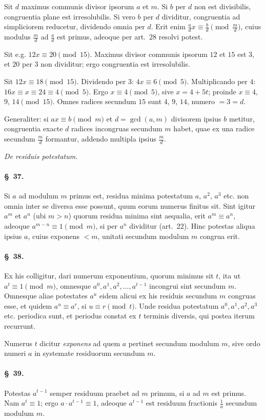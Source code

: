 \documentclass[12pt,a4paper]{article}
\theoremstyle{plain}
\theoremstyle{definition}
\theoremstyle{remark}
\newcommand{\art}[1]{\paragraph{\S\ #1.}}
\begin{document}
Sit $d$ maximus communis divisor ipsorum $a$ et $m$. Si $b$ per $d$ non est divisibilis, congruentia plane est irresolubilis. Si vero $b$ per $d$ dividitur, congruentia ad simpliciorem reducetur, dividendo omnia per $d$. Erit enim $\frac{a}{d}x \equiv \frac{b}{d} \pmod{\frac{m}{d}}$, cuius modulus $\frac{m}{d}$ ad $\frac{a}{d}$ est primus, adeoque per art.~28 resolvi potest.

Sit e.g. $12x \equiv 20 \pmod{15}$. Maximus divisor communis ipsorum $12$ et $15$ est $3$, et $20$ per $3$ non dividitur; ergo congruentia est irresolubilis.

Sit $12x \equiv 18 \pmod{15}$. Dividendo per $3$: $4x \equiv 6 \pmod{5}$. Multiplicando per $4$: $16x \equiv x \equiv 24 \equiv 4 \pmod{5}$. Ergo $x \equiv 4 \pmod{5}$, sive $x = 4 + 5t$; proinde $x \equiv 4$, $9$, $14 \pmod{15}$. Omnes radices secundum $15$ sunt $4$, $9$, $14$, numero $= 3 = d$.

Generaliter: si $ax \equiv b \pmod{m}$ et $d = \gcd(a,m)$ divisorem ipsius $b$ metitur, congruentia exacte $d$ radices incongruas secundum $m$ habet, quae ex una radice secundum $\frac{m}{d}$ formantur, addendo multipla ipsius $\frac{m}{d}$.

\begin{center}
\textit{De residuis potestatum.}
\end{center}

\art{37}
Si $a$ ad modulum $m$ primus est, residua minima potestatum $a$, $a^2$, $a^3$ etc. non omnia inter se diversa esse possunt, quum eorum numerus finitus sit. Sint igitur $a^m$ et $a^n$ (ubi $m > n$) quorum residua minima sint aequalia, erit $a^m \equiv a^n$, adeoque $a^{m-n} \equiv 1 \pmod{m}$, si per $a^n$ dividitur (art.~22). Hinc potestas aliqua ipsius $a$, cuius exponens $< m$, unitati secundum modulum $m$ congrua erit.

\art{38}
Ex his colligitur, dari numerum exponentium, quorum minimus sit $t$, ita ut $a^t \equiv 1 \pmod{m}$, omnesque $a^0, a^1, a^2, \ldots, a^{t-1}$ incongrui sint secundum $m$. Omnesque aliae potestates $a^u$ eidem alicui ex his residuis secundum $m$ congruas esse, et quidem $a^u \equiv a^r$, si $u \equiv r \pmod{t}$. Unde residua potestatum $a^0, a^1, a^2, a^3$ etc. periodica sunt, et periodus constat ex $t$ terminis diversis, qui postea iterum recurrunt.

Numerus $t$ dicitur \emph{exponens} ad quem $a$ pertinet secundum modulum $m$, sive ordo numeri $a$ in systemate residuorum secundum $m$.

\art{39}
Potestas $a^{t-1}$ semper residuum praebet ad $m$ primum, si $a$ ad $m$ est primus. Nam $a^t \equiv 1$; ergo $a \cdot a^{t-1} \equiv 1$, adeoque $a^{t-1}$ est residuum fractionis $\frac{1}{a}$ secundum modulum $m$.
\end{document}
